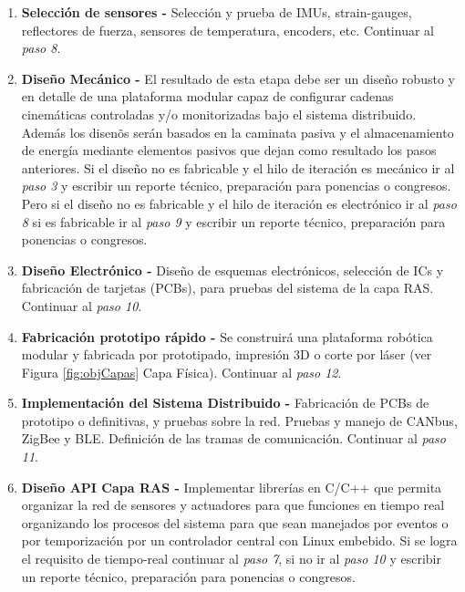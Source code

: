 \documentclass[12pt,twoside,onecolumn,letterpaper]{article}
\begin{document}
\begin{enumerate}
\item \textbf{Selecci\'on de sensores - } Selecci\'on y prueba de IMUs, strain-gauges, reflectores de fuerza, sensores de temperatura, encoders, etc. Continuar al \emph{paso 8}.\par
\item \textbf{Dise\~no Mec\'anico - } El resultado de esta etapa debe ser un dise\~no robusto y en detalle de una plataforma modular capaz de configurar cadenas cinem\'aticas controladas y/o monitorizadas bajo el sistema distribuido. Adem\'as los disen\~os ser\'an basados en la caminata pasiva y el almacenamiento de energ\'ia mediante elementos pasivos que dejan como resultado los pasos anteriores. Si el dise\~no no es fabricable y el hilo de iteraci\'on es mec\'anico ir al \emph{paso 3} y escribir un reporte t\'ecnico, preparaci\'on para ponencias o congresos. Pero si el dise\~no no es fabricable y el hilo de iteraci\'on es electr\'onico ir al \emph{paso 8} si es fabricable ir al \emph{paso 9} y escribir un reporte t\'ecnico, preparaci\'on para ponencias o congresos.\par
\item \textbf{Dise\~no Electr\'onico - } Dise\~no de esquemas electrónicos, selección de ICs y fabricaci\'on de tarjetas (PCBs), para pruebas del sistema de la capa RAS. Continuar al \emph{paso 10}.\par
\item \textbf{Fabricaci\'on prototipo r\'apido - } Se construir\'a una plataforma rob\'otica modular y fabricada por prototipado, impresión 3D o corte por láser (ver Figura \ref{fig:objCapas} Capa Física). Continuar al \emph{paso 12}.\par
\item \textbf{Implementaci\'on del Sistema Distribuido - } Fabricaci\'on de PCBs de prototipo o definitivas, y pruebas sobre la red. Pruebas y manejo de CANbus, ZigBee y BLE. Definición de las tramas de comunicaci\'on. Continuar al \emph{paso 11}.\par
\item \textbf{Dise\~no API Capa RAS - } Implementar librerías en C/C++ que permita organizar la red de sensores y actuadores para que funciones en tiempo real organizando los procesos del sistema para que sean manejados por eventos o por temporizaci\'on por un controlador central con Linux embebido. Si se logra el requisito de tiempo-real continuar al \emph{paso 7}, si no ir al \emph{paso 10} y escribir un reporte t\'ecnico, preparaci\'on para ponencias o congresos.\par

\end{enumerate}
\end{document}
